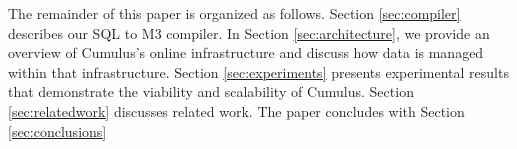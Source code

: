 The remainder of this paper is organized as follows.
Section \ref{sec:compiler} describes our SQL to M3 compiler.
In Section \ref{sec:architecture}, we provide an overview of Cumulus's online
infrastructure and discuss how data is managed within that infrastructure.
Section \ref{sec:experiments} presents
experimental results that demonstrate the viability and scalability of
Cumulus.
Section \ref{sec:relatedwork} discusses related work.
The paper concludes with Section \ref{sec:conclusions}




